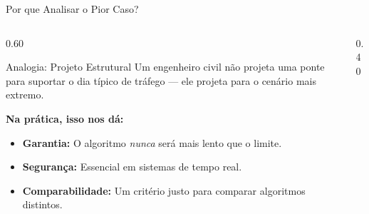 \documentclass[aspectratio=169]{beamer}
\begin{document}
\begin{frame}[shrink]{Por que Analisar o Pior Caso?}
    \begin{columns}[T]
    \begin{column}{0.60\textwidth}
        \begin{block}{Analogia: Projeto Estrutural}
            Um engenheiro civil não projeta uma ponte para suportar o dia típico de tráfego --- ele projeta para o cenário mais extremo.        \end{block}
        
        \textbf{Na prática, isso nos dá:}
        \begin{itemize}
            \item \textbf{Garantia:} O algoritmo \emph{nunca} será mais lento que o limite.
            \item \textbf{Segurança:} Essencial em sistemas de tempo real.
            \item \textbf{Comparabilidade:} Um critério justo para comparar algoritmos distintos.
        \end{itemize}
    \end{column}
    \begin{column}{0.40\textwidth}
        \begin{center}
        \end{center}
    \end{column}
    \end{columns}
\end{frame}
\end{document}
